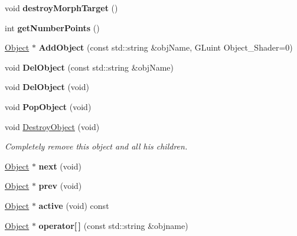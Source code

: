 \begin{DoxyCompactItemize}
\item 
\hypertarget{class_object_a98d3f1b9ebb61c3b21e2a59ed267480a}{void {\bfseries destroy\-Morph\-Target} ()}\label{class_object_a98d3f1b9ebb61c3b21e2a59ed267480a}

\item 
\hypertarget{class_object_aae9b55b35a69ba78aa2803b4c8a681b7}{int {\bfseries get\-Number\-Points} ()}\label{class_object_aae9b55b35a69ba78aa2803b4c8a681b7}

\item 
\hypertarget{class_scene_a366b5dec1ecf66a887b4d0dedcd1aa3b}{\hyperlink{class_object}{Object} $\ast$ {\bfseries Add\-Object} (const std\-::string \&obj\-Name, G\-Luint Object\-\_\-\-Shader=0)}\label{class_scene_a366b5dec1ecf66a887b4d0dedcd1aa3b}

\item 
\hypertarget{class_scene_a3bd9fa1058f506c04162b9283e97d20e}{void {\bfseries Del\-Object} (const std\-::string \&obj\-Name)}\label{class_scene_a3bd9fa1058f506c04162b9283e97d20e}

\item 
\hypertarget{class_scene_a43fd3c56db5dc940d1724b9573c9a360}{void {\bfseries Del\-Object} (void)}\label{class_scene_a43fd3c56db5dc940d1724b9573c9a360}

\item 
\hypertarget{class_scene_abdfd15e7987aa261840d5ecc265170df}{void {\bfseries Pop\-Object} (void)}\label{class_scene_abdfd15e7987aa261840d5ecc265170df}

\item 
\hypertarget{class_scene_a82759ded1f6f87a91b8d10ed87501958}{void \hyperlink{class_scene_a82759ded1f6f87a91b8d10ed87501958}{Destroy\-Object} (void)}\label{class_scene_a82759ded1f6f87a91b8d10ed87501958}

\begin{DoxyCompactList}\small\item\em Completely remove this object and all his children. \end{DoxyCompactList}\item 
\hypertarget{class_scene_a70fcdad192a4c6ff508125de8af6cf4d}{\hyperlink{class_object}{Object} $\ast$ {\bfseries next} (void)}\label{class_scene_a70fcdad192a4c6ff508125de8af6cf4d}

\item 
\hypertarget{class_scene_ac852d5d763eb35b4908c9aa7ea54d1ae}{\hyperlink{class_object}{Object} $\ast$ {\bfseries prev} (void)}\label{class_scene_ac852d5d763eb35b4908c9aa7ea54d1ae}

\item 
\hypertarget{class_scene_ad0ea1a6bcf7815c63988bd937f06eb23}{\hyperlink{class_object}{Object} $\ast$ {\bfseries active} (void) const }\label{class_scene_ad0ea1a6bcf7815c63988bd937f06eb23}

\item 
\hypertarget{class_scene_ae9b69d8db8a46991017635f22e45baad}{\hyperlink{class_object}{Object} $\ast$ {\bfseries operator\mbox{[}$\,$\mbox{]}} (const std\-::string \&objname)}\label{class_scene_ae9b69d8db8a46991017635f22e45baad}

\end{DoxyCompactItemize}
